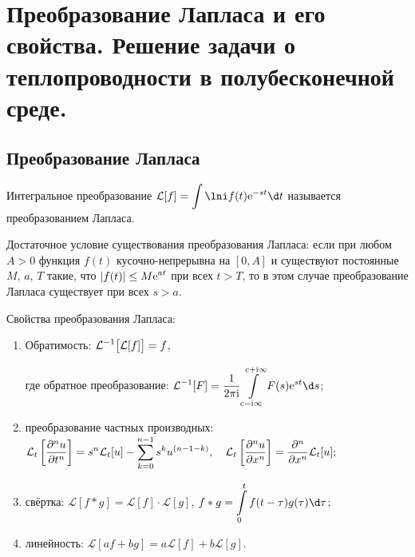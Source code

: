 \chapter{Преобразование Лапласа и его свойства. Решение задачи о
теплопроводности в полубесконечной среде.}

\section{Преобразование Лапласа}
Интегральное преобразование \( \ds \mathcal{L}[f] = \int\lni f(t)\e^{-st}\d t \)
называется преобразованием Лапласа.

Достаточное условие существования преобразования Лапласа: если при любом
\( A > 0 \) функция \( f(t) \) кусочно-непрерывна на \( [0, A] \) и существуют
постоянные \( M \), \( a \), \( T \) такие, что \( \displaystyle |f(t)| \le M\mathrm{e}^{at} \)
при всех \( t > T \), то в этом случае преобразование Лапласа существует при
всех \( s > a \).

Свойства преобразования Лапласа:
\begin{enumerate}
    \item Обратимость: \( \displaystyle \mathcal{L}^{-1}\bigl[\mathcal{L}[f]\bigr] = f \),
    
    где обратное преобразование: \( \ds \mathcal{L}^{-1}[F] = \frac{1}{2\pi\i}
    \int\limits_{c-\i\infty}^{c+\i\infty} F(s)\e^{st}\d s \);
    
    \item преобразование частных производных:\\
    \(
        \displaystyle \mathcal{L}_t\left[\frac{\partial^{n} u}{\partial t^{n}}\right] = s^n\mathcal{L}_t[u] - 
            \sum\limits_{k=0}^{n-1} s^k u^{(n - 1 - k)},\quad 
        \displaystyle \mathcal{L}_t\left[\frac{\partial^{n} u}{\partial x^{n}}\right] =
            \frac{\partial^{n} }{\partial x^{n}}\mathcal{L}_t[u];
    \)
    
    \item свёртка: \( \mathcal{L}[f*g] = \mathcal{L}[f]\cdot \mathcal{L}[g] \),
    \( \ds f*g = \int\limits_0^t f(t-\tau)g(\tau)\d\tau \);
    
    \item линейность:
        \( \mathcal{L}[af + bg] = a\mathcal{L}[f] + b\mathcal{L}[g] \).
\end{enumerate}

